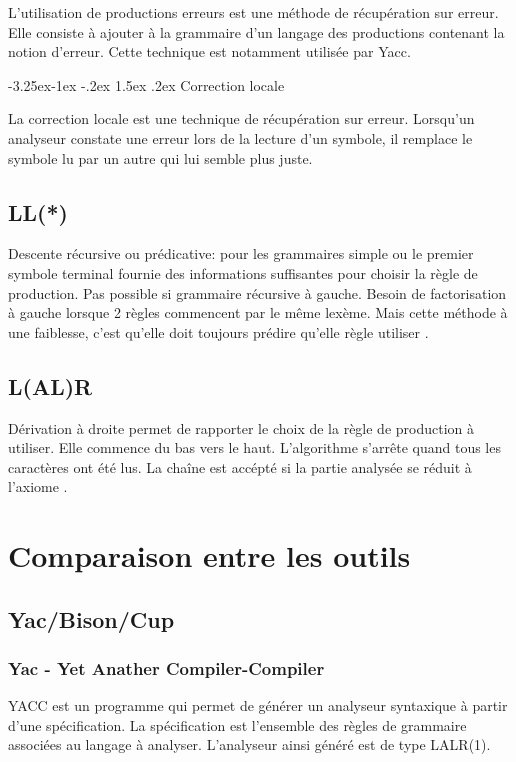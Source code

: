\documentclass{article}
\makeatletter
\newcounter {subsubsubsection}[subsubsection]
\newcommand\subsubsubsection{\@startsection{subsubsubsection}{4}{\z@}%
                                     {-3.25ex\@plus -1ex \@minus -.2ex}%
                                     {1.5ex \@plus .2ex}%
                                     {\normalfont\normalsize\bfseries}}
\makeatother
\begin{document}
L'utilisation de productions erreurs \cite{refProductionErreurs} est une méthode de récupération sur erreur. Elle consiste à ajouter à la grammaire d'un langage des productions contenant la notion d'erreur. Cette technique est notamment utilisée par Yacc.

\subsubsubsection{Correction locale}

La correction locale \cite{refCorrectionLocale} est une technique de récupération sur erreur. Lorsqu'un analyseur constate une erreur lors de la lecture d'un symbole, il remplace le symbole lu par un autre qui lui semble plus juste.


\subsection{LL(*)}
Descente récursive ou prédicative: pour les grammaires simple ou le premier symbole terminal fournie des informations suffisantes pour choisir la règle de production.
Pas possible si grammaire récursive à gauche.
Besoin de factorisation à gauche lorsque 2 règles commencent par le même lexème.
Mais cette méthode à une faiblesse, c’est qu’elle doit toujours prédire qu’elle règle utiliser \cite{refModernCompiler}.

\subsection{L(AL)R}
Dérivation à droite permet de rapporter le choix de la règle de production à utiliser.
Elle commence du bas vers le haut.
L’algorithme s’arrête quand tous les caractères ont été lus. La chaîne est accépté si la partie analysée se réduit à l’axiome 
\cite{refModernCompiler}.

\section{Comparaison entre les outils}
\label{hints}

\subsection{Yac/Bison/Cup}


\subsubsection{Yac - Yet Anather Compiler-Compiler}
YACC est un programme qui permet de générer un analyseur syntaxique à partir d’une spécification. La spécification est l’ensemble des règles de grammaire associées au langage à analyser.
L’analyseur ainsi généré est de type LALR(1).
\end{document}
